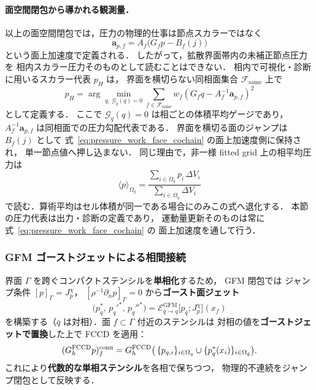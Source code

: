 \paragraph{面空間閉包から導かれる観測量．}
以上の面空間閉包では，圧力の物理的仕事は節点スカラーではなく
\begin{equation}
  \mathbf{a}_{p,f}
  =
  A_f\bigl(G_fp-B_f(j)\bigr)
  \label{eq:pressure_work_face_cochain}
\end{equation}
という面上加速度で定義される．
したがって，拡散界面帯内の未補正節点圧力を
相内スカラー圧力そのものとして読むことはできない．
相内で可視化・診断に用いるスカラー代表 $p_H$ は，
界面を横切らない同相面集合 $\mathcal F_{\mathrm{same}}$ 上で
\begin{equation}
  p_H
  =
  \arg\min_{q,\ \mathcal G_q(q)=0}
  \sum_{f\in\mathcal F_{\mathrm{same}}}
  w_f
  \left(
    G_fq-A_f^{-1}\mathbf{a}_{p,f}
  \right)^2
  \label{eq:phase_hodge_pressure_representative}
\end{equation}
として定義する．
ここで $\mathcal G_q(q)=0$ は相ごとの体積平均ゲージであり，
$A_f^{-1}\mathbf{a}_{p,f}$ は同相面での圧力勾配代表である．
界面を横切る面のジャンプは $B_f(j)$ として
式~\eqref{eq:pressure_work_face_cochain} の面上加速度側に保持され，
単一節点値へ押し込まない．
同じ理由で，非一様 fitted grid 上の相平均圧力は
\begin{equation}
  \langle p\rangle_{\Omega_q}
  =
  \frac{\sum_{i\in\Omega_q}p_i\,\Delta V_i}
       {\sum_{i\in\Omega_q}\Delta V_i}
  \label{eq:phase_volume_weighted_pressure_mean}
\end{equation}
で読む．算術平均はセル体積が同一である場合にのみこの式へ退化する．
本節の圧力代表は出力・診断の定義であり，
運動量更新そのものは常に式~\eqref{eq:pressure_work_face_cochain} の
面上加速度を通して行う．

\subsubsection{GFM ゴーストジェットによる相間接続}
\label{sec:gfm_ghost_jet_connection}

界面 $\Gamma$ を跨ぐコンパクトステンシルを\textbf{単相化}するため，
GFM 閉包では
ジャンプ条件 $[p]_\Gamma=J_p^\chi$，
$[\rho^{-1}\partial_n p]_\Gamma=0$
から\textbf{ゴースト面ジェット}
\begin{equation}
  \bigl(p_q^\ast,\,p_q'^\ast,\,p_q''^\ast\bigr)
    = \mathcal{E}_{\bar q\to q}^{\mathrm{GFM}}
      \bigl[p_{\bar q};J_p^\chi\bigr](x_f)
  \label{eq:gfm_ghost_jet}
\end{equation}
を構築する（$\bar q$ は対相）．面 $f\subset\Gamma$ 付近のステンシルは
対相の値を\textbf{ゴーストジェットで置換}した上で FCCD を適用：
\begin{equation}
  (G_h^{\mathrm{FCCD}} p)_f^\mathrm{conn}
    = G_h^{\mathrm{FCCD}}\bigl(\,\{p_{q,i}\}_{i\in\Omega_q}
      \cup \{p_q^\ast(x_i)\}_{i\in\Omega_{\bar q}}\bigr).
  \label{eq:fccd_connection_face}
\end{equation}
これにより\textbf{代数的な単相ステンシル}を各相で保ちつつ，
物理的不連続をジャンプ閉包として反映する．

